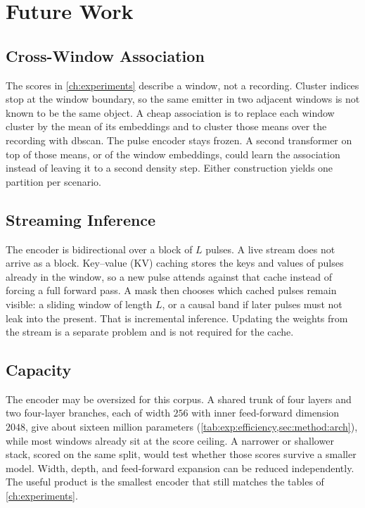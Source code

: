 \section{Future Work}\label{sec:concl:future}

\subsection{Cross-Window Association}\label{sec:concl:future:windows}

The scores in \cref{ch:experiments} describe a window, not a recording.
Cluster indices stop at the window boundary, so the same emitter in two adjacent windows is not known to be the same object.
A cheap association is to replace each window cluster by the mean of its embeddings and to cluster those means over the recording with \gls{dbscan}.
The pulse encoder stays frozen.
A second transformer on top of those means, or of the window embeddings, could learn the association instead of leaving it to a second density step.
Either construction yields one partition per scenario.

\subsection{Streaming Inference}\label{sec:concl:future:online}

The encoder is bidirectional over a block of $L$ pulses.
A live stream does not arrive as a block.
Key--value (KV) caching stores the keys and values of pulses already in the window, so a new pulse attends against that cache instead of forcing a full forward pass.
A mask then chooses which cached pulses remain visible: a sliding window of length $L$, or a causal band if later pulses must not leak into the present.
That is incremental inference.
Updating the weights from the stream is a separate problem and is not required for the cache.

\subsection{Capacity}\label{sec:concl:future:capacity}

The encoder may be oversized for this corpus.
A shared trunk of four layers and two four-layer branches, each of width $256$ with inner feed-forward dimension $2048$, give about sixteen million parameters (\cref{tab:exp:efficiency,sec:method:arch}), while most windows already sit at the score ceiling.
A narrower or shallower stack, scored on the same split, would test whether those scores survive a smaller model.
Width, depth, and feed-forward expansion can be reduced independently.
The useful product is the smallest encoder that still matches the tables of \cref{ch:experiments}.

